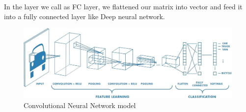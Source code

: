     In the layer we call as FC layer, we flattened our matrix into vector and feed it into a fully connected layer like Deep neural network.
    \begin{figure}[h]
        \centering
        \includegraphics[width=0.5\linewidth]{cnn.png}
        \caption{Convolutional Neural Network model}
        \label{fig:Convolutional Neural Network model}
    \end{figure} 
